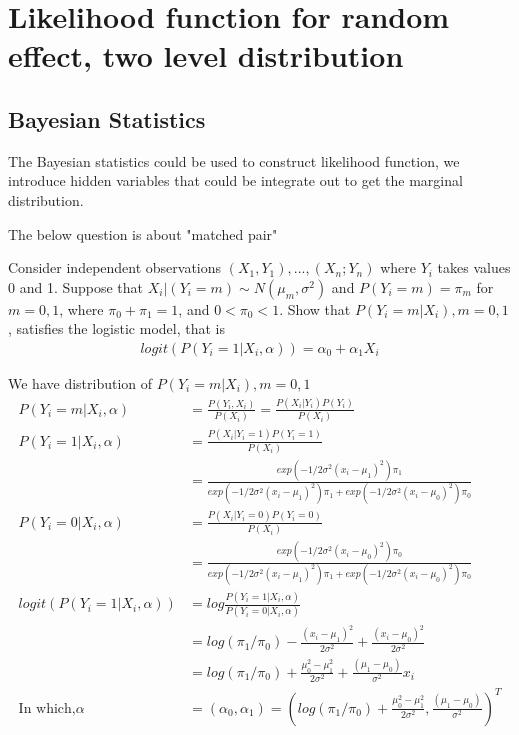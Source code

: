 \documentclass[11pt]{article} %
\begin{document}
	
	\section{Likelihood function for random effect, two level distribution}
	
\subsection{Bayesian Statistics}
The Bayesian statistics could be used to construct likelihood function, we introduce hidden variables that could be integrate out to get the marginal distribution.

The below question is about "matched pair"

Consider independent observations $(X_1, Y_1),..., (X_n; Y_n)$ where $Y_i$ takes values 0 and
1. Suppose that $X_i|(Y_i = m) \sim N(\mu_m, \sigma^2)$ and $P(Y_i = m) = \pi_m$ for $m = 0, 1$, where
$\pi_0 + \pi_1 = 1$, and $0 < \pi_0 < 1$. Show that $P(Y_i = m|X_i), m = 0, 1$, satisfies the logistic model, that is
	\begin{align*}
		logit \left(P(Y_i = 1|X_i,\alpha) \right) = \alpha_0 + \alpha_1 X_i
	\end{align*}

	We have distribution of $P(Y_i = m|X_i), m = 0, 1$ 
	\begin{align*}
		P(Y_i=m |X_i,\alpha) & = \frac{P(Y_i, X_i)}{P(X_i)} = \frac{P(X_i|Y_i) P(Y_i)}{P(X_i)}\\
		P(Y_i=1 |X_i,\alpha) &= \frac{P(X_i|Y_i=1) P(Y_i=1)}{P(X_i)} \\
		&= \frac{exp(-1/2\sigma^2 (x_i-\mu_1)^2) \pi_1}{exp(-1/2\sigma^2 (x_i-\mu_1)^2) \pi_1 + exp(-1/2\sigma^2 (x_i-\mu_0)^2)  \pi_0}\\
		P(Y_i=0 |X_i,\alpha) &= \frac{P(X_i|Y_i=0) P(Y_i=0)}{P(X_i)}\\
		&= \frac{exp(-1/2\sigma^2 (x_i-\mu_0)^2)  \pi_0}{exp(-1/2\sigma^2 (x_i-\mu_1)^2) \pi_1 + exp(-1/2\sigma^2 (x_i-\mu_0)^2)  \pi_0}\\
		logit \left(P(Y_i = 1|X_i,\alpha) \right) &= log \frac{ P(Y_i=1 |X_i,\alpha)}{P(Y_i=0 |X_i,\alpha)} \\
		&= log(\pi_1/\pi_0) - \frac{(x_i-\mu_1)^2}{2\sigma^2} + \frac{(x_i-\mu_0)^2}{2\sigma^2}\\
		&= log(\pi_1/\pi_0) +\frac{\mu_0^2 - \mu_1^2}{2\sigma^2} + \frac{(\mu_1-\mu_0)}{\sigma^2}x_i\\
		\text{In which,}  \alpha &= (\alpha_0, \alpha_1) = \left(log(\pi_1/\pi_0) +\frac{\mu_0^2 - \mu_1^2}{2\sigma^2},  \frac{(\mu_1-\mu_0)}{\sigma^2} \right)^T
	\end{align*}
     
\end{document}
